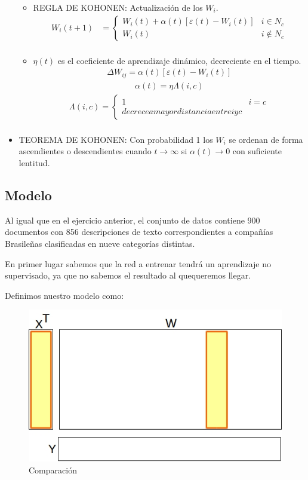 \begin{itemize}
\begin{itemize}
			\item REGLA DE KOHONEN: Actualización de los $W_{i}$.
					\begin{align*}
					 W_{i}(t+1) &=  \begin{cases}
										W_{i}(t) + \alpha(t) [ \varepsilon(t) - W_{i}(t) ] & i \in N_{c} \\
										W_{i}(t)                                           & i \not \in N_{c}  
									\end{cases} \\
					\end{align*}
			\item $\eta(t)$ es el coeficiente de aprendizaje dinámico, decreciente en el tiempo.
				\begin{align*}
					\Delta W_{ij} = \alpha(t) [ \varepsilon(t) - W_{i}(t) ]
				\end{align*}
				\begin{align*}
					\alpha(t) = \eta \Lambda(i,c)
				\end{align*}
				\begin{align*}
					\Lambda(i,c) = \begin{cases}
										1 & i = c \\
										decrece a mayor distancia entre i y c 
									\end{cases} \\
				\end{align*}
		\end{itemize}
	\item TEOREMA DE KOHONEN: Con probabilidad 1 los $W_{i}$ se ordenan de forma ascendientes o descendientes cuando $t \to
		\infty$ si $\alpha(t) \to 0$ con suficiente lentitud.
\end{itemize}

\subsection{Modelo}
Al igual que en el ejercicio anterior, el conjunto de datos contiene 900 documentos con 856 descripciones de texto correspondientes a compañías Brasileñas clasificadas en nueve categorías distintas.

En primer lugar sabemos que la red a entrenar tendrá un aprendizaje no supervisado, ya que no sabemos el resultado al quequeremos llegar.

Definimos nuestro modelo como:

\begin{figure}[ht!]
	\centering
	\includegraphics[width=0.7\linewidth]{img/parte2-comparacion.jpg}
	\caption{Comparación}
	\label{comparacion}
\end{figure}

